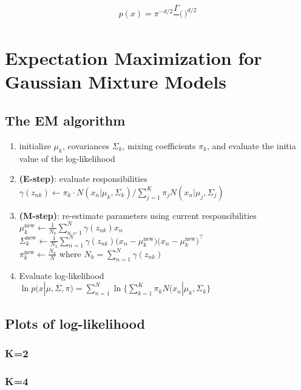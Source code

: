 \documentclass{article}
\begin{document}
$$p(x) = \pi^{-d/2} \frac{\Gamma}{} \Bigg( \frac{}{} \Bigg )^{d/2}$$




\section{Expectation Maximization for Gaussian Mixture Models}

\subsection{The EM algorithm}
\begin{enumerate}
	\item initialize $\mu_k$, covariances $\Sigma_k$, mixing coefficients $\pi_k$, and evaluate the initia value of the log-likelihood
	\item \textbf{(E-step)}: evaluate responsibilities\\
$\gamma(z_{nk}) \leftarrow \pi_k \cdot N(x_n | \mu_k, \Sigma_k) / \displaystyle \sum_{j=1}^K \pi_j N(x_n | \mu_j, \Sigma_j)$ \\
		\item \textbf{(M-step)}: re-estimate parameters using current responsibilities\\
	$\mu_k^{\text{new}} \leftarrow \frac{1}{N_k} \displaystyle \sum_{n=1}^N \gamma(z_{nk}) x_n$ \\
$\Sigma_k^{\text{new}} \leftarrow \frac{1}{N_k} \displaystyle \sum_{n=1}^N \gamma(z_{nk}) \Big(x_n - \mu_k^\text{new}\Big)\Big(x_n - \mu_k^\text{new}\Big)^\top$ \\
$ \pi_k^\text{new} \leftarrow \frac{N_k}{N}$ where $N_k = \displaystyle \sum_{n=1}^N \gamma(z_{nk})$

\item Evaluate log-likelihood \\
$\ln p(x | \mu, \Sigma, \pi) = \displaystyle \sum_{n=1}^N  \ln \Big\{ \sum_{k=1}^K \pi_k N(x_n | \mu_k, \Sigma_k \Big\} $

\end{enumerate}

\subsection{Plots of log-likelihood}
\subsubsection{K=2}
\subsubsection{K=4}
\end{document}

